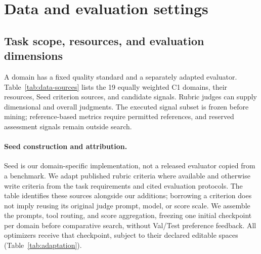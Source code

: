 \setcounter{figure}{0}
\setcounter{table}{0}
\renewcommand{\thefigure}{A\arabic{figure}}
\renewcommand{\thetable}{A\arabic{table}}
\renewcommand{\theHfigure}{appendix.\arabic{figure}}
\renewcommand{\theHtable}{appendix.\arabic{table}}

\section{Data and evaluation settings}
\label{app:domains}

\subsection{Task scope, resources, and evaluation dimensions}
\label{app:domain-signals}
A domain has a fixed quality standard and a separately adapted evaluator.
Table~\ref{tab:data-sources} lists the 19 equally weighted C1 domains, their resources, Seed criterion sources, and candidate signals.
Rubric judges can supply dimensional and overall judgments.
The executed signal subset is frozen before mining; reference-based metrics require permitted references, and reserved assessment signals remain outside search.

\paragraph{Seed construction and attribution.}
Seed is our domain-specific implementation, not a released evaluator copied from a benchmark.
We adapt published rubric criteria where available and otherwise write criteria from the task requirements and cited evaluation protocols.
The table identifies these sources alongside our additions; borrowing a criterion does not imply reusing its original judge prompt, model, or score scale.
We assemble the prompts, tool routing, and score aggregation, freezing one initial checkpoint per domain before comparative search, without Val/Test preference feedback.
All optimizers receive that checkpoint, subject to their declared editable spaces (Table~\ref{tab:adaptation}).

